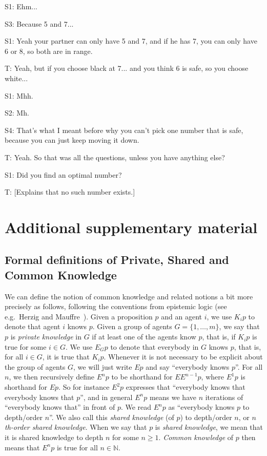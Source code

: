 S1: Ehm...

S3: Because 5 and 7...

S1: Yeah your partner can only have 5 and 7, and if he has 7, you can only have 6 or 8, so both are in range.

T: Yeah, but if you choose black at 7... and you think 6 is safe, so you choose white...

S1: Mhh.

S2: Mh.

S4: That's what I meant before why you can't pick one number that is safe, because you can just keep moving it down.

T: Yeah. So that was all the questions, unless you have anything else?

S1: Did you find an optimal number?

T: [Explains that no such number exists.]
 

\section{Additional supplementary material}


\subsection{Formal definitions of Private, Shared and Common Knowledge}
\label{A:definitions}
We can define the notion of common knowledge and related notions a bit more precisely as follows, following the conventions from epistemic logic (see e.g.\ Herzig and Mauffre~\cite{herzig2015share}). Given a proposition $p$ and an agent $i$, we use $K_i p$ to denote that agent $i$ knows $p$. Given a group of agents $G = \{1,\dots,m\}$, we say that $p$ is \emph{private knowledge} in $G$ if at least one of the agents know $p$, that is, if $K_i p$ is true for some $i \in G$. We use $E_G p$ to denote that everybody in $G$ knows $p$, that is, for all $i \in G$, it is true that $K_i p$. Whenever it is not necessary to be explicit about the group of agents $G$, we will just write $E p$ and say ``everybody knows $p$''. For all $n$, we then recursively define $E^n p$ to be shorthand for $E E^{n-1} p$, where $E^1 p$ is shorthand for $E p$. So for instance $E^2 p$ expresses that ``everybody knows that everybody knows that $p$'', and in general $E^n p$ means we have $n$ iterations of ``everybody knows that'' in front of $p$. We read $E^n p$ as ``everybody knows $p$ to depth/order $n$''. We also call this \emph{shared knowledge} (of $p$) to depth/order $n$, or \emph{$n$th-order shared knowledge}. When we say that $p$ is \emph{shared knowledge}, we mean that it is shared knowledge to depth $n$ for some $n \geq 1$. \emph{Common knowledge} of $p$ then means that $E^n p$ is true for all $n \in \mathbb{N}$.

